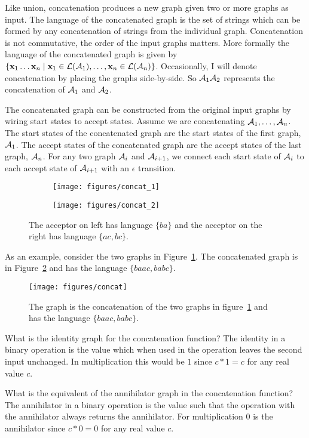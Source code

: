 Like union, concatenation produces a new graph given two or more graphs as
input. The language of the concatenated graph is the set of strings which can
be formed by any concatenation of strings from the individual graph.
Concatenation is not commutative, the order of the input graphs matters. More
formally the language of the concatenated graph is given by $\{{\bf x}_1 \ldots
{\bf x}_n \mid {\bf x}_1 \in \mathcal{L}(\mathcal{A}_1), \ldots, {\bf x}_n \in \mathcal{L}(\mathcal{A}_n)\}$. Occasionally, I
will denote concatenation by placing the graphs side-by-side. So $\mathcal{A}_1 \mathcal{A}_2$
represents the concatenation of $\mathcal{A}_1$ and $\mathcal{A}_2$.

The concatenated graph can be constructed from the original input graphs by
wiring start states to accept states. Assume we are concatenating $\mathcal{A}_1,
\ldots, \mathcal{A}_n$. The start states of the concatenated graph are the start
states of the first graph, $\mathcal{A}_1$. The accept states of the concatenated
graph are the accept states of the last graph, $\mathcal{A}_n$. For any two graph
$\mathcal{A}_i$ and $\mathcal{A}_{i+1}$, we connect each start state of $\mathcal{A}_i$ to each accept
state of $\mathcal{A}_{i+1}$ with an $\epsilon$ transition.

\begin{figure}
    \centering
    \begin{subfigure}[b]{0.48\textwidth}
        \centering
        \texttt{[image: figures/concat\_1]}
    \end{subfigure}
    \begin{subfigure}[b]{0.48\textwidth}
        \centering
        \texttt{[image: figures/concat\_2]}
    \end{subfigure}
    \caption{The acceptor on left has language $\{ba\}$ and the acceptor on the
    right has language $\{ac, bc\}$.}
    \label{fig:concat_inputs}
\end{figure}

As an example, consider the two graphs in Figure~\ref{fig:concat_inputs}. The
concatenated graph is in Figure~\ref{fig:concat} and has the language $\{baac,
babc\}$.

\begin{figure}
    \centering
    \texttt{[image: figures/concat]}
    \caption{The graph is the concatenation of the two graphs in
    figure~\ref{fig:concat_inputs} and has the language $\{baac, babc\}$.}
    \label{fig:concat}
\end{figure}

\begin{example}
What is the identity graph for the concatenation function? The identity in a
binary operation is the value which when used in the operation leaves the second
input unchanged. In multiplication this would be $1$ since $c * 1 = c$ for any
real value $c$.

What is the equivalent of the annihilator graph in the concatenation function?
The annihilator in a binary operation is the value such that the operation with
the annihilator always returns the annihilator. For multiplication $0$ is the
annihilator since $c *0 = 0$ for any real value $c$.
\end{example}

